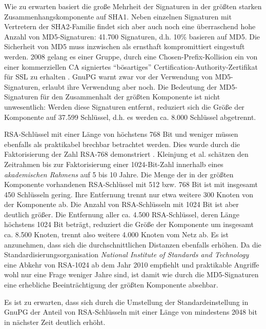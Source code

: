 Wie zu erwarten basiert die große Mehrheit der Signaturen in der
größten starken Zusammenhangskomponente auf SHA1. Neben einzelnen
Signaturen mit Vertretern der SHA2-Familie findet sich aber auch noch
eine überraschend hohe Anzahl von MD5-Signaturen: 41.700 Signaturen,
d.h. 10\% basieren auf MD5. Die Sicherheit von MD5 muss inzwischen als
ernsthaft kompromittiert eingestuft werden. 2008 gelang es einer
Gruppe, durch eine Chosen-Prefix-Kollision ein von einer kommerziellen
CA signiertes ``bösartiges'' Certification-Authority-Zertifikat
für SSL zu erhalten \cite{Stevens2009}. GnuPG warnt zwar vor der
Verwendung von MD5-Signaturen, erlaubt ihre Verwendung aber noch. Die
Bedeutung der MD5-Signaturen für den Zusammenhalt der größten
Komponente ist nicht unwesentlich: Werden diese Signaturen entfernt,
reduziert sich die Größe der Komponente auf 37.599 Schlüssel,
d.h. es werden ca. 8.000 Schlüssel abgetrennt. 

RSA-Schlüssel mit einer Länge von höchstens 768 Bit und weniger
müssen ebenfalls als praktikabel brechbar betrachtet werden. Dies
wurde durch die Faktorisierung der Zahl RSA-768 demonstriert
\cite{Kleinjung2010}. Kleinjung et al. schätzen den Zeitrahmen bis
zur Faktorisierung einer 1024-Bit-Zahl innerhalb eines
\emph{akademischen Rahmens} auf 5 bis 10 Jahre. Die Menge der in der
größten Komponente vorhandenen RSA-Schlüssel mit 512 bzw. 768 Bit
ist mit insgesamt 450 Schlüsseln gering. Ihre Entfernung trennt nur
etwa weitere 300 Knoten von der Komponente ab. Die Anzahl von
RSA-Schlüsseln mit 1024 Bit ist aber deutlich größer. Die
Entfernung aller ca. 4.500 RSA-Schlüssel, deren Länge höchstens
1024 Bit beträgt, reduziert die Größe der Komponente um insgesamt
ca. 8.500 Knoten, trennt also weitere 4.000 Knoten vom Netz ab. Es ist
anzunehmen, dass sich die durchschnittlichen Distanzen ebenfalls
erhöhen. Da die Standardisierungsorganisation \emph{National Institute
 of Standards and Technology} 
  eine Abkehr von RSA-1024
ab dem Jahr 2010 empfiehlt \cite{NIST2007} und praktikable Angriffe
wohl nur eine Frage weniger Jahre sind, ist damit wie durch die
MD5-Signaturen eine erhebliche Beeinträchtigung der größten
Komponente absehbar.

Es ist zu erwarten, dass sich durch die Umstellung der
Standardeinstellung in GnuPG der Anteil von RSA-Schlüsseln mit
einer Länge von mindestens 2048 bit in nächster Zeit deutlich
erhöht.



